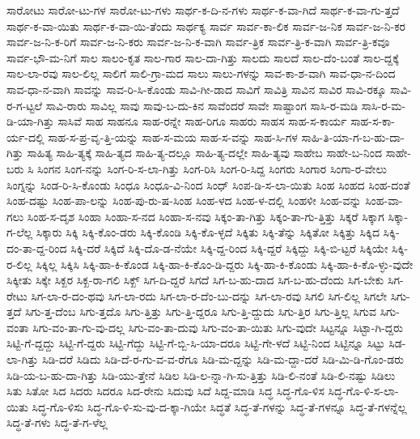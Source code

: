 {ಸಾರೋಟು
ಸಾರೋ-ಟು-ಗಳ
ಸಾರೋ-ಟು-ಗಳು
ಸಾರ್ಥ-ಕ-ದಿ-ನ-ಗಳು
ಸಾರ್ಥ-ಕ-ವಾ-ಗಿದೆ
ಸಾರ್ಥ-ಕ-ವಾ-ಗು-ತ್ತದೆ
ಸಾರ್ಥ-ಕ-ವಾ-ಯಿತು
ಸಾರ್ಥ-ಕ-ವಾ-ಯಿ-ತೆಂದು
ಸಾರ್ಥಕ್ಯ
ಸಾರ್ವ
ಸಾರ್ವ-ಕಾ-ಲಿಕ
ಸಾರ್ವ-ಜ-ನಿಕ
ಸಾರ್ವ-ಜ-ನಿ-ಕರ
ಸಾರ್ವ-ಜ-ನಿ-ಕ-ರಿಗೆ
ಸಾರ್ವ-ಜ-ನಿ-ಕರು
ಸಾರ್ವ-ಜ-ನಿ-ಕ-ವಾಗಿ
ಸಾರ್ವ-ತ್ರಿಕ
ಸಾರ್ವ-ತ್ರಿ-ಕ-ವಾಗಿ
ಸಾರ್ವ-ತ್ರಿ-ಕವೂ
ಸಾರ್ವ-ಭೌ-ಮ-ನಿಗೆ
ಸಾಲ
ಸಾಲಂ-ಕೃತ
ಸಾಲ-ಗಾರ
ಸಾಲ-ದಾ-ಗಿತ್ತು
ಸಾಲದು
ಸಾಲದೆ
ಸಾಲ-ದೆಂ-ಬಂತೆ
ಸಾಲ-ದ್ದಕ್ಕೆ
ಸಾಲ-ಲಾ-ರವು
ಸಾಲ-ಲಿಲ್ಲ
ಸಾಲಿಗೆ
ಸಾಲಿ-ಗ್ರಾ-ಮದ
ಸಾಲು
ಸಾಲು-ಗಳನ್ನು
ಸಾವ-ಕಾ-ಶ-ವಾಗಿ
ಸಾವ-ಧಾ-ನ-ದಿಂದ
ಸಾವ-ಧಾ-ನ-ವಾಗಿ
ಸಾವನ್ನು
ಸಾವ-ರಿ-ಸಿ-ಕೊಂಡು
ಸಾವಿ-ಗೀ-ಡಾದ
ಸಾವಿಗೆ
ಸಾವಿತ್ರಿ
ಸಾವಿನ
ಸಾವಿರ
ಸಾವಿ-ರಕ್ಕೂ
ಸಾವಿ-ರ-ಗ-ಟ್ಟಲೆ
ಸಾವಿ-ರಾರು
ಸಾವಿಲ್ಲ
ಸಾವು
ಸಾವು-ಬ-ದು-ಕಿನ
ಸಾವೆಂದರೆ
ಸಾವೇ
ಸಾಷ್ಟಾಂಗ
ಸಾಸಿ-ರ-ಮಡಿ
ಸಾಸಿ-ರ-ಮ-ಡಿ-ಯಾ-ಗಿತ್ತು
ಸಾಸಿವೆ
ಸಾಹ
ಸಾಹನೂ
ಸಾಹ-ರನ್ನೇ
ಸಾಹ-ರಿಗೂ
ಸಾಹರು
ಸಾಹಸ
ಸಾಹ-ಸ-ಕಾರ್ಯ
ಸಾಹ-ಸ-ಕಾ-ರ್ಯ-ದಲ್ಲಿ
ಸಾಹ-ಸ-ಪ್ರ-ವೃ-ತ್ತಿ-ಯನ್ನು
ಸಾಹ-ಸ-ಮಯ
ಸಾಹ-ಸ-ವನ್ನು
ಸಾಹ-ಸಿ-ಗಳ
ಸಾಹಿ-ತಿ-ಯಾ-ಗ-ಬ-ಹು-ದಾ-ಗಿತ್ತು
ಸಾಹಿತ್ಯ
ಸಾಹಿ-ತ್ಯಕ್ಕೆ
ಸಾಹಿ-ತ್ಯದ
ಸಾಹಿ-ತ್ಯ-ದಲ್ಲೂ
ಸಾಹಿ-ತ್ಯ-ದಲ್ಲೇ
ಸಾಹಿ-ತ್ಯವು
ಸಾಹೇಬ
ಸಾಹೇ-ಬ-ನಿಂದ
ಸಾಹೇ-ಬರು
ಸಿ
ಸಿಂಗನ
ಸಿಂಗ-ನನ್ನು
ಸಿಂಗ-ರಿ-ಸ-ಲಾ-ಗಿತ್ತು
ಸಿಂಗ-ರಿಸಿ
ಸಿಂಗ-ರಿ-ಸಿದ್ದ
ಸಿಂಗರು
ಸಿಂಗಾರ
ಸಿಂಗಾ-ರ-ವೇಲು
ಸಿಂಗ್ನನ್ನು
ಸಿಂಡ-ರಿ-ಸಿ-ಕೊಂಡು
ಸಿಂಧೂ
ಸಿಂಧೂ-ವಿ-ನಿಂದ
ಸಿಂಧ್
ಸಿಂಪ-ಡಿ-ಸ-ಲಾ-ಯಿತು
ಸಿಂಹ
ಸಿಂಹದ
ಸಿಂಹ-ದಂತೆ
ಸಿಂಹ-ದಷ್ಟು
ಸಿಂಹ-ಪಾ-ಲನ್ನು
ಸಿಂಹ-ಪು-ರು-ಷ-ಸಿಂಹ
ಸಿಂಹ-ಳದ
ಸಿಂಹ-ಳ-ದಲ್ಲಿ
ಸಿಂಹಳೀ
ಸಿಂಹ-ವನ್ನು
ಸಿಂಹ-ವಾ-ಗಲು
ಸಿಂಹ-ಸ-ದೃಶ
ಸಿಂಹಾ
ಸಿಂಹಾ-ಸ-ನದ
ಸಿಂಹಾ-ಸ-ನವು
ಸಿಕ್ಕಂ-ತಾ-ಗಿತ್ತು
ಸಿಕ್ಕಂ-ತಾ-ಗು-ತ್ತಿತ್ತು
ಸಿಕ್ಕರೆ
ಸಿಕ್ಕಾಗ
ಸಿಕ್ಕಾ-ಗ-ಲೆಲ್ಲ
ಸಿಕ್ಕಾರು
ಸಿಕ್ಕಿ
ಸಿಕ್ಕಿ-ಕೊಂ-ಡರು
ಸಿಕ್ಕಿ-ಕೊಂಡಿ
ಸಿಕ್ಕಿ-ಕೊ-ಳ್ಳದೆ
ಸಿಕ್ಕಿತು
ಸಿಕ್ಕಿ-ತೆನ್ನು
ಸಿಕ್ಕಿತೋ
ಸಿಕ್ಕಿತ್ತು
ಸಿಕ್ಕಿದ
ಸಿಕ್ಕಿ-ದಂ-ತಾ-ದ್ದ-ರಿಂದ
ಸಿಕ್ಕಿ-ದರೆ
ಸಿಕ್ಕಿದೆ
ಸಿಕ್ಕಿ-ದೊ-ಡ-ನೆಯೇ
ಸಿಕ್ಕಿ-ದ್ದ-ರಿಂದ
ಸಿಕ್ಕಿ-ದ್ದರೆ
ಸಿಕ್ಕಿದ್ದು
ಸಿಕ್ಕಿ-ಬಿ-ಟ್ಟರೆ
ಸಿಕ್ಕಿಯೇ
ಸಿಕ್ಕಿ-ರ-ಲಿಲ್ಲ
ಸಿಕ್ಕಿಲ್ಲ
ಸಿಕ್ಕಿಸಿ
ಸಿಕ್ಕಿ-ಹಾ-ಕಿ-ಕೊಂಡ
ಸಿಕ್ಕಿ-ಹಾ-ಕಿ-ಕೊಂ-ಡಿ-ದ್ದರು
ಸಿಕ್ಕಿ-ಹಾ-ಕಿ-ಕೊಂಡು
ಸಿಕ್ಕಿ-ಹಾ-ಕಿ-ಕೊ-ಳ್ಳು-ವುದೇ
ಸಿಕ್ಕೀತು
ಸಿಕ್ಕೇ
ಸಿಕ್ಖರ
ಸಿಕ್ಖ-ರಾ-ಗಲಿ
ಸಿಕ್ಖ್
ಸಿಗ-ದಿ-ದ್ದರೆ
ಸಿಗದೆ
ಸಿಗ-ಬ-ಹು-ದಾದ
ಸಿಗ-ಬ-ಹು-ದೆಂದು
ಸಿಗ-ಬೇಕು
ಸಿಗ-ರೇಟು
ಸಿಗ-ಲಾ-ರ-ದಂ-ಥವು
ಸಿಗ-ಲಾ-ರದು
ಸಿಗ-ಲಾ-ರ-ದೆಂ-ಬು-ದನ್ನು
ಸಿಗ-ಲಾ-ರವು
ಸಿಗಲಿ
ಸಿಗ-ಲಿಲ್ಲ
ಸಿಗಲೇ
ಸಿಗು-ತ್ತದೆ
ಸಿಗು-ತ್ತ-ದೆಂಬ
ಸಿಗು-ತ್ತದೊ
ಸಿಗು-ತ್ತಿತ್ತು
ಸಿಗು-ತ್ತಿ-ದ್ದರೂ
ಸಿಗು-ತ್ತಿ-ದ್ದುದು
ಸಿಗು-ತ್ತಿರ
ಸಿಗು-ತ್ತಿಲ್ಲ
ಸಿಗುವ
ಸಿಗು-ವಂತಾ
ಸಿಗು-ವಂ-ತಾ-ಗು-ವು-ದಲ್ಲ
ಸಿಗು-ವಂ-ತಾ-ದುವು
ಸಿಗು-ವಂ-ತಾ-ಯಿತು
ಸಿಗು-ವುದೇ
ಸಿಟ್ಟನ್ನೂ
ಸಿಟ್ಟಾ-ಗಿ-ದ್ದರು
ಸಿಟ್ಟಿ-ಗೆ-ದ್ದದ್ದು
ಸಿಟ್ಟಿ-ಗೆ-ದ್ದರು
ಸಿಟ್ಟಿ-ಗೆದ್ದು
ಸಿಟ್ಟಿ-ಗೆ-ಬ್ಬಿ-ಸಿ-ಯಾ-ದರೂ
ಸಿಟ್ಟಿ-ಗೇ-ಳದೆ
ಸಿಟ್ಟಿ-ನಿಂದ
ಸಿಟ್ಟಿನ್ನೂ
ಸಿಟ್ಟು
ಸಿಡ-ಲಾ-ಗಿತ್ತು
ಸಿಡಿ-ದರೆ
ಸಿಡಿದು
ಸಿಡಿ-ದೆ-ರ-ಗು-ವ-ವ-ರೆಗೂ
ಸಿಡಿ-ಮ-ದ್ದನ್ನು
ಸಿಡಿ-ಮ-ದ್ದಾ-ದರೆ
ಸಿಡಿ-ಮಿ-ಡಿ-ಗೊಂ-ಡರು
ಸಿಡಿ-ಯ-ಬ-ಹು-ದಾ-ಗಿತ್ತು
ಸಿಡಿ-ಯು-ತ್ತೇನೆ
ಸಿಡಿಲ
ಸಿಡಿ-ಲ-ನ್ನಾ-ಗಿ-ಸು-ತ್ತಿತ್ತು
ಸಿಡಿ-ಲಿ-ನಂತೆ
ಸಿಡಿ-ಲಿ-ನಷ್ಟು
ಸಿಡಿಲು
ಸಿತು
ಸಿತೋ
ಸಿದ
ಸಿದರು
ಸಿದರೂ
ಸಿದ-ರೇನು
ಸಿದುವು
ಸಿದೆ
ಸಿದ್ದ-ಮಾಡಿ
ಸಿದ್ಧ
ಸಿದ್ಧ-ಗೊ-ಳಿಸ
ಸಿದ್ಧ-ಗೊ-ಳಿ-ಸ-ಲಾ-ಯಿತು
ಸಿದ್ಧ-ಗೊ-ಳಿಸು
ಸಿದ್ಧ-ಗೊ-ಳಿ-ಸು-ವು-ದ-ಕ್ಕಾ-ಗಿಯೇ
ಸಿದ್ಧತೆ
ಸಿದ್ಧ-ತೆ-ಗಳನ್ನು
ಸಿದ್ಧ-ತೆ-ಗಳನ್ನೂ
ಸಿದ್ಧ-ತೆ-ಗಳನ್ನೆಲ್ಲ
ಸಿದ್ಧ-ತೆ-ಗಳು
ಸಿದ್ಧ-ತೆ-ಗ-ಳೆಲ್ಲ
}
